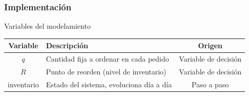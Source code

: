 \subsubsection{Implementación}

\begin{mitabla}[H]{Variables del modelamiento}
\begin{tabular}{cL{8cm}c}
\toprule
Variable & Descripción & Origen \\
\midrule
$q$ & Cantidad fija a ordenar en cada pedido & Variable de decisión \\
$R$ & Punto de reorden (nivel de inventario) & Variable de decisión \\
inventario & Estado del sistema, evoluciona día a día & Paso a paso \\
\bottomrule
\end{tabular}
\end{mitabla}

